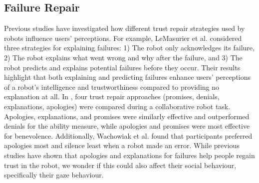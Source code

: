 \subsection{Failure Repair}
Previous studies have investigated how different trust repair strategies used by robots influence users' perceptions. For example, LeMasurier et al. \cite{lemasurier_reactive_2024} considered three strategies for explaining failures: 1) The robot only acknowledges its failure, 2) The robot explains what went wrong and why after the failure, and 3) The robot predicts and explains potential failures before they occur. Their results highlight that both explaining and predicting failures enhance users' perceptions of a robot's intelligence and trustworthiness compared to providing no explanation at all.
In \cite{esterwood_you_2021}, four trust repair approaches (promises, denials, explanations, apologies) were compared during a collaborative robot task. Apologies, explanations, and promises were similarly effective and outperformed denials for the ability measure, while apologies and promises were most effective for benevolence.
Additionally, Wachowiak et al. \cite{wachowiak_when_2024} found that participants preferred apologies most and silence least when a robot made an error.
While previous studies have shown that apologies and explanations for failures help people regain trust in the robot, we wonder if this could also affect their social behaviour, specifically their gaze behaviour.






